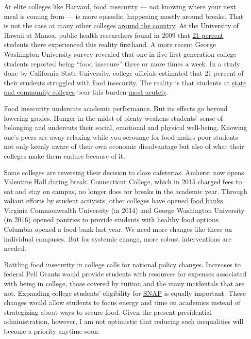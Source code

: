 At elite colleges like Harvard, food insecurity --- not knowing where
your next meal is coming from --- is more episodic, happening mostly
around breaks. That is not the case at many other colleges
\href{https://studentsagainsthunger.org/hunger-on-campus/}{around the
country}. At the University of Hawaii at Manoa, public health
researchers found in 2009 that
\href{https://www.cambridge.org/core/journals/public-health-nutrition/article/div-classtitlefood-insecurity-prevalence-among-college-students-at-the-university-of-hawaii-at-mnoadiv/21D2F99685FB0C06061003AB6B9DEE62}{21
percent} students there experienced this reality firsthand. A more
recent George Washington University survey revealed that one in five
first-generation college students reported being ``food insecure'' three
or more times a week. In a study done by California State University,
college officials estimated that 21 percent of their students struggled
with food insecurity. The reality is that students at
\href{https://www.nytimes3xbfgragh.onion/2015/12/04/opinion/hungry-homeless-and-in-college.html}{state
and community colleges} bear this burden
\href{https://www.nytimes3xbfgragh.onion/2018/01/14/opinion/hunger-college-food-insecurity.html}{most
acutely}.

Food insecurity undercuts academic performance. But its effects go
beyond lowering grades. Hunger in the midst of plenty weakens students'
sense of belonging and undercuts their social, emotional and physical
well-being. Knowing one's peers are away relaxing while you scrounge for
food makes poor students not only keenly aware of their own economic
disadvantage but also of what their colleges make them endure because of
it.

Some colleges are reversing their decision to close cafeterias. Amherst
now opens Valentine Hall during break. Connecticut College, which in
2015 charged fees to eat and stay on campus, no longer does for breaks
in the academic year. Through valiant efforts by student activists,
other colleges have opened
\href{http://www.npr.org/sections/thesalt/2016/10/14/497948224/more-colleges-open-food-pantries-to-address-campus-hunger}{food
banks}. Virginia Commonwealth University (in 2014) and George Washington
University (in 2016) opened pantries to provide students with healthy
food options. Columbia opened a food bank last year. We need more
changes like these on individual campuses. But for systemic change, more
robust interventions are needed.

Battling food insecurity in college calls for national policy changes.
Increases to federal Pell Grants would provide students with resources
for expenses associated with being in college, those covered by tuition
and the many incidentals that are not. Expanding college students'
eligibility for
\href{https://www.benefits.gov/benefits/benefit-details/361}{SNAP} is
equally important. These changes would allow students to focus energy
and time on academics instead of strategizing about ways to secure food.
Given the present presidential administration, however, I am not
optimistic that reducing such inequalities will become a priority
anytime soon.

